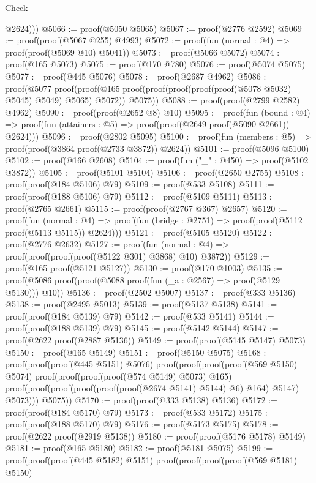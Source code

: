 \begin{lexlean}{Check}
\begin{coremodule}
          @2624)))
@5066 := proof(@5050 @5065)
@5067 := proof(@2776 @2592)
@5069 := proof(proof(@5067 @255) @4993)
@5072 := proof(fun (normal : @4) => proof(proof(@5069 @10) @5041))
@5073 := proof(@5066 @5072)
@5074 := proof(@165 @5073)
@5075 := proof(@170 @780)
@5076 := proof(@5074 @5075)
@5077 := proof(@445 @5076)
@5078 := proof(@2687 @4962)
@5086 := proof(@5077
      proof(proof(@165 proof(proof(proof(proof(proof(@5078 @5032) @5045) @5049) @5065) @5072))
          @5075))
@5088 := proof(proof(@2799 @2582) @4962)
@5090 := proof(proof(@2652 @8) @10)
@5095 := proof(fun (bound : @4) =>
    proof(fun (attainers : @5) => proof(proof(@2649 proof(@5090 @2661)) @2624)))
@5096 := proof(@2802 @5095)
@5100 := proof(fun (members : @5) => proof(proof(@3864 proof(@2733 @3872)) @2624))
@5101 := proof(@5096 @5100)
@5102 := proof(@166 @2608)
@5104 := proof(fun ("_" : @450) => proof(@5102 @3872))
@5105 := proof(@5101 @5104)
@5106 := proof(@2650 @2755)
@5108 := proof(proof(@184 @5106) @79)
@5109 := proof(@533 @5108)
@5111 := proof(proof(@188 @5106) @79)
@5112 := proof(@5109 @5111)
@5113 := proof(@2765 @2661)
@5115 := proof(proof(@2767 @367) @2657)
@5120 := proof(fun (normal : @4) =>
    proof(fun (bridge : @2751) => proof(proof(@5112 proof(@5113 @5115)) @2624)))
@5121 := proof(@5105 @5120)
@5122 := proof(@2776 @2632)
@5127 := proof(fun (normal : @4) => proof(proof(proof(proof(@5122 @301) @3868) @10) @3872))
@5129 := proof(@165 proof(@5121 @5127))
@5130 := proof(@170 @1003)
@5135 := proof(@5086 proof(proof(@5088 proof(fun (_a : @2567) => proof(@5129 @5130))) @10))
@5136 := proof(@2502 @5007)
@5137 := proof(@333 @5136)
@5138 := proof(@2495 @5013)
@5139 := proof(@5137 @5138)
@5141 := proof(proof(@184 @5139) @79)
@5142 := proof(@533 @5141)
@5144 := proof(proof(@188 @5139) @79)
@5145 := proof(@5142 @5144)
@5147 := proof(@2622 proof(@2887 @5136))
@5149 := proof(proof(@5145 @5147) @5073)
@5150 := proof(@165 @5149)
@5151 := proof(@5150 @5075)
@5168 := proof(proof(proof(@445 @5151) @5076)
      proof(proof(proof(proof(@569 @5150) @5074)
            proof(proof(proof(proof(@574 @5149) @5073) @165)
                proof(proof(proof(proof(proof(proof(@2674 @5141) @5144) @6) @164) @5147) @5073)))
          @5075))
@5170 := proof(proof(@333 @5138) @5136)
@5172 := proof(proof(@184 @5170) @79)
@5173 := proof(@533 @5172)
@5175 := proof(proof(@188 @5170) @79)
@5176 := proof(@5173 @5175)
@5178 := proof(@2622 proof(@2919 @5138))
@5180 := proof(proof(@5176 @5178) @5149)
@5181 := proof(@165 @5180)
@5182 := proof(@5181 @5075)
@5199 := proof(proof(proof(@445 @5182) @5151)
      proof(proof(proof(proof(@569 @5181) @5150)

\end{coremodule}
\end{lexlean}
